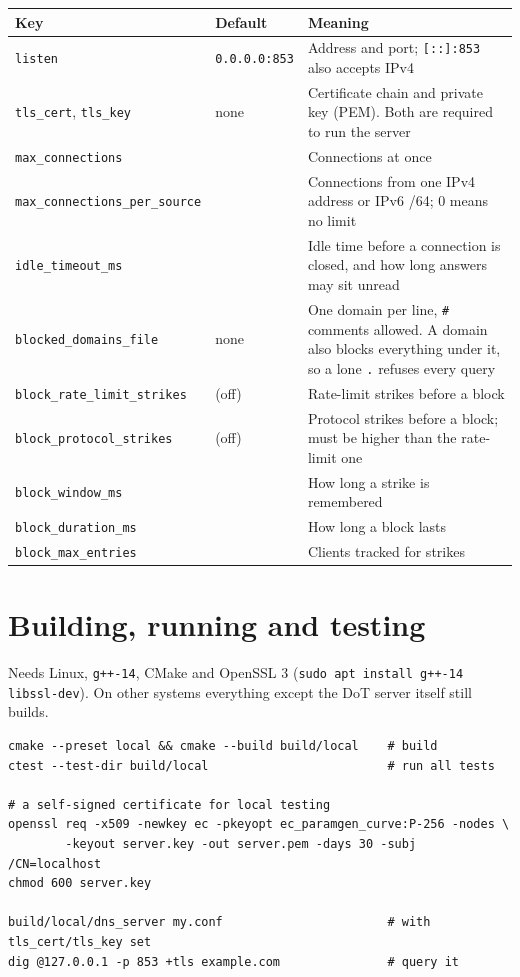 \documentclass[11pt,a4paper]{article}
\begin{document}
\begin{tabularx}{\linewidth}{@{}>{\raggedright\arraybackslash}p{54mm}>{\raggedright\arraybackslash}p{22mm}X@{}}
\toprule
\textbf{Key} & \textbf{Default} & \textbf{Meaning} \\
\midrule
\texttt{listen} & \texttt{0.0.0.0:853} & Address and port; \texttt{[::]:853} also accepts IPv4 \\
\texttt{tls\_cert}, \texttt{tls\_key} & none & Certificate chain and private key (PEM). Both are
  required to run the server \\
\texttt{max\_connections} & 1000 & Connections at once \\
\texttt{max\_connections\_per\_source} & 32 & Connections from one IPv4 address or IPv6 /64; 0
  means no limit \\
\texttt{idle\_timeout\_ms} & 10000 & Idle time before a connection is closed, and how long answers
  may sit unread \\
\texttt{blocked\_domains\_file} & none & One domain per line, \texttt{\#} comments allowed. A domain
  also blocks everything under it, so a lone \texttt{.} refuses every query \\
\texttt{block\_rate\_limit\_strikes} & 0 (off) & Rate-limit strikes before a block \\
\texttt{block\_protocol\_strikes} & 0 (off) & Protocol strikes before a block; must be higher than
  the rate-limit one \\
\texttt{block\_window\_ms} & 10000 & How long a strike is remembered \\
\texttt{block\_duration\_ms} & 300000 & How long a block lasts \\
\texttt{block\_max\_entries} & 100000 & Clients tracked for strikes \\
\bottomrule
\end{tabularx}

\section{Building, running and testing}

Needs Linux, \texttt{g++-14}, CMake and OpenSSL 3 (\texttt{sudo apt install g++-14 libssl-dev}).
On other systems everything except the DoT server itself still builds.

\begin{lstlisting}
cmake --preset local && cmake --build build/local    # build
ctest --test-dir build/local                         # run all tests

# a self-signed certificate for local testing
openssl req -x509 -newkey ec -pkeyopt ec_paramgen_curve:P-256 -nodes \
        -keyout server.key -out server.pem -days 30 -subj /CN=localhost
chmod 600 server.key

build/local/dns_server my.conf                       # with tls_cert/tls_key set
dig @127.0.0.1 -p 853 +tls example.com               # query it
\end{lstlisting}
\end{document}
